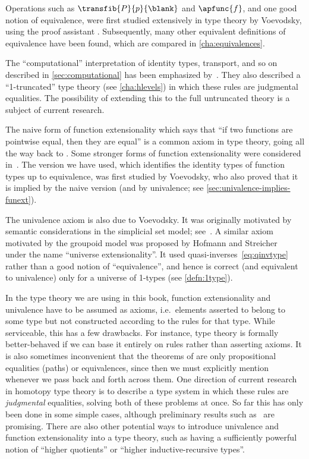 %
Operations such as $\transfib{P}{p}{\blank}$ and $\apfunc{f}$, and one good notion of equivalence, were first studied extensively in type theory by Voevodsky, using the proof assistant \Coq.
Subsequently, many other equivalent definitions of equivalence have been found, which are compared in \cref{cha:equivalences}.

The ``computational'' interpretation of identity types, transport, and so on described in \cref{sec:computational} has been emphasized by~\cite{lh:canonicity}.
They also described a ``1-truncated'' type theory (see \cref{cha:hlevels}) in which these rules are judgmental equalities.
The possibility of extending this to the full untruncated theory is a subject of current research.

%
The naive form of function extensionality which says that ``if two functions are pointwise equal, then they are equal'' is a common axiom in type theory, going all the way back to \cite{PM2}.
Some stronger forms of function extensionality were considered in~\cite{garner:depprod}.
The version we have used, which identifies the identity types of function types up to equivalence, was first studied by Voevodsky, who also proved that it is implied by the naive version (and by univalence; see \cref{sec:univalence-implies-funext}).

%
The univalence axiom is also due to Voevodsky.
It was originally motivated by semantic considerations in the simplicial set model; see~\cite{klv:ssetmodel}.
A similar axiom motivated by the groupoid model was proposed by Hofmann and Streicher~\cite{hs:gpd-typethy} under the name ``universe extensionality''.
It used quasi-inverses~\eqref{eq:qinvtype} rather than a good notion of ``equivalence'', and hence is correct (and equivalent to univalence) only for a universe of 1-types (see \cref{defn:1type}).

In the type theory we are using in this book, function extensionality and univalence have to be assumed as axioms, i.e.\ elements asserted to belong to some type but not constructed according to the rules for that type.
While serviceable, this has a few drawbacks.
For instance, type theory is formally better-behaved if we can base it entirely on rules rather than asserting axioms.
It is also sometimes inconvenient that the theorems of  are only propositional equalities (paths) or equivalences, since then we must explicitly mention whenever we pass back and forth across them.
One direction of current research in homotopy type theory is to describe a type system in which these rules are \emph{judgmental} equalities, solving both of these problems at once.
So far this has only been done in some simple cases, although preliminary results such as~\cite{lh:canonicity} are promising.
There are also other potential ways to introduce univalence and function extensionality into a type theory, such as having a sufficiently powerful notion of ``higher quotients'' or ``higher inductive-recursive types''.

